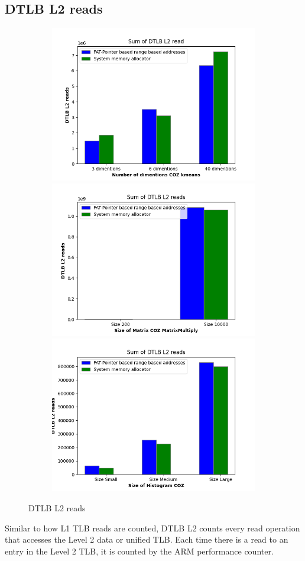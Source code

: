 \subsection{DTLB L2 reads}
\begin{figure}
  \begin{subfigure}{\linewidth}
    \includegraphics[width=.5\linewidth]{l2-tlb-kmeans.png}\hfill
    \includegraphics[width=.5\linewidth]{l2-tlb-matrixmultiply.png}\hfill
    \includegraphics[width=.5\linewidth]{l2-tlb-histogram.png}
\end{subfigure}
\caption{DTLB L2 reads}
\label{fig:TLBl2}
\end{figure}
Similar to how L1 TLB reads are counted, DTLB L2 counts every read operation that accesses the 
Level 2 data or unified TLB. Each time there is a read to an entry in the Level 2 TLB, 
it is counted by the ARM performance counter. 


